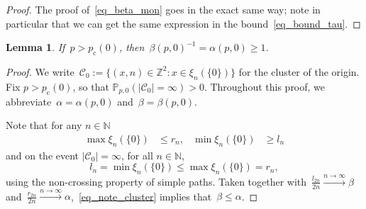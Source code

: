 \documentclass[pdflatex,sn-mathphys-num]{sn-jnl}%
\newcommand{\cC}{\ensuremath{\mathcal C}}
\newcommand{\bbN}{{\ensuremath{\mathbb N}} }
\newcommand{\bbZ}{{\ensuremath{\mathbb Z}} }
\newcommand{\1}{{\ensuremath{\mathbf{1}}} }
\newcommand{\pc}{\ensuremath{p_{\mathrm{c}} }}
\theoremstyle{thmstyleone}%
\newtheorem{lemma}[theorem]{Lemma}%
\theoremstyle{thmstyletwo}%
\theoremstyle{thmstylethree}%
\begin{document}
\begin{proof}
The proof of~\eqref{eq_beta_mon} goes in the exact same way; note in particular that we can get the same expression in the bound~\eqref{eq_bound_tau}.
\end{proof}



\begin{lemma}
\label{lem:alpha:critical}
	If~$p > \pc(0)$, then~$\beta(p,0)^{-1} = \alpha(p,0) \ge 1$.
\end{lemma}
\begin{proof}
We write~$\cC_0 := \{(x,n){\in\bbZ^2}: x \in \xi_n(\{0\})\}$ {for the cluster of the origin.}
Fix $p > \pc(0)$, so that $\mathbb P_{p,0}(|\mathcal C_0| = \infty) > 0$. Throughout this proof, we abbreviate~$\alpha = \alpha(p,0)$ and~$\beta = \beta(p,0)$.

Note that for any $n\in\bbN$
\begin{align*}
\max \xi_n(\{0\}) &{}\le r_n,&\min \xi_n(\{0\}) &{}\ge l_n
\end{align*}
and on the event $|\cC_0|=\infty$, for all $n\in\bbN$,
\begin{equation}
\label{eq_note_cluster}
l_n = \min \xi_n(\{0\}) \le \max \xi_n(\{0\}) = r_n,
\end{equation}
{using the non-crossing property of simple paths.} Taken together with~$\frac{l_{2n}}{2n} \xrightarrow{n \to \infty} \beta$ and~$\frac{r_{2n}}{2n} \xrightarrow{n \to \infty} \alpha$,~\eqref{eq_note_cluster} implies that~$\beta \le \alpha$.


\end{proof}
\end{document}
